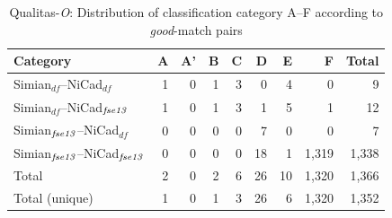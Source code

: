\documentclass{IEEEtran}
\begin{document}

\begin{table}[H]
	\centering
	\caption{Qualitas-\textit{O}: Distribution of classification category A--F according to \textit{good}-match pairs}
	\label{tab:good_classification}
	\begin{tabular}{|l|r|r|r|r|r|r|r|r|}
		\hline 
		Category   & A   & 	A'   & 	B   & C   & D   &	E   &	F   & Total  \\
		\hline
		Simian$_{\mathrm{\textit{df}}}$--NiCad$_{\mathrm{\textit{df}}}$   & 1 & 0 & 1 & 3 & 0 & 4 & 0 & 9 \\
		Simian$_{\mathrm{\textit{df}}}$--NiCad$_{\textrm{\textit{fse13}}}$   & 1 & 0 & 1 & 3 & 1 & 5 & 1 & 12 \\
		Simian$_{\textrm{\textit{fse13}}}$--NiCad$_{\mathrm{\textit{df}}}$   & 0 & 0 & 0 & 0 & 7 & 0 & 0 & 7 \\
		Simian$_{\textrm{\textit{fse13}}}$--NiCad$_{\textrm{\textit{fse13}}}$   & 0 & 0 & 0 & 0 & 18 & 1 & 1,319 & 1,338 \\
		\hline
		Total   &   2   &   0   &  2   &  6   &   26   &   10   & 1,320  & 1,366 \\
		Total (unique)  &   1   &   0   &  1   &  3   &   26   &   6   & 1,320  & 1,352 \\
		\hline
	\end{tabular} 
\end{table}
\end{document}
